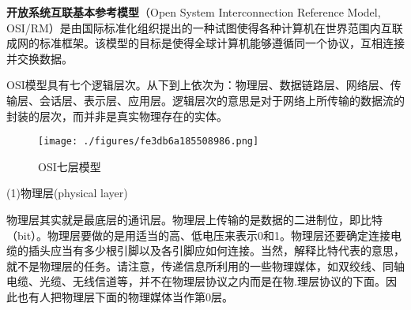 
\textbf{开放系统互联基本参考模型}（Open System Interconnection Reference Model, OSI/RM）是由国际标准化组织提出的一种试图使得各种计算机在世界范围内互联成网的标准框架。该模型的目标是使得全球计算机能够遵循同一个协议，互相连接并交换数据。

OSI模型具有七个逻辑层次。从下到上依次为：物理层、数据链路层、网络层、传输层、会话层、表示层、应用层。逻辑层次的意思是对于网络上所传输的数据流的封装的层次，而并非是真实物理存在的实体。
\begin{figure}[ht]
\centering
\texttt{[image: ./figures/fe3db6a185508986.png]}
\caption{OSI七层模型} \label{fig_OSIRM_1}
\end{figure}

(1)物理层(physical layer)

物理层其实就是最底层的通讯层。物理层上传输的是数据的二进制位，即比特（bit）。物理层要做的是用适当的高、低电压来表示0和1。物理层还要确定连接电缆的插头应当有多少根引脚以及各引脚应如何连接。当然，解释比特代表的意思，就不是物理层的任务。请注意，传递信息所利用的一些物理媒体，如双绞线、同轴电缆、光缆、无线信道等，并不在物理层协议之内而是在物.理层协议的下面。因此也有人把物理层下面的物理媒体当作第0层。
